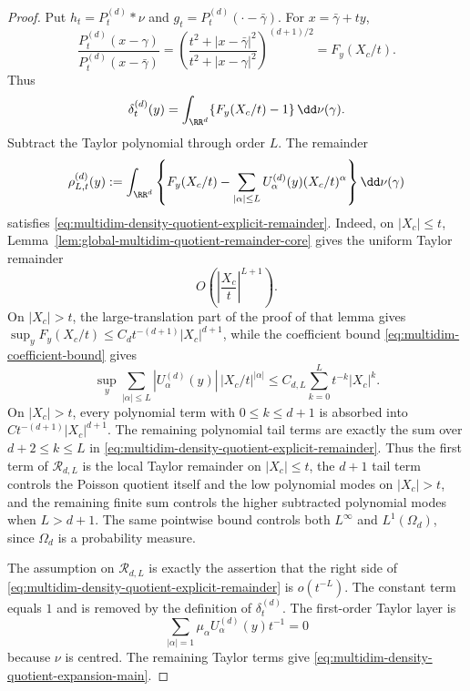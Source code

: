 \begin{proof}
Put \(h_t=P_t^{(d)}*\nu\) and \(g_t=P_t^{(d)}(\cdot-\bar{\gamma})\).
For \(x=\bar{\gamma}+ty\),
\[
\frac{P_t^{(d)}(x-\gamma)}{P_t^{(d)}(x-\bar{\gamma})}
=
\left(\frac{t^2+|x-\bar{\gamma}|^2}{t^2+|x-\gamma|^2}\right)^{(d+1)/2}
=F_y(X_c/t).
\]
Thus
\[
\delta_t^{(d)}(y)=\int_{\RR^d}\{F_y(X_c/t)-1\}\,\dd\nu(\gamma).
\]
Subtract the Taylor polynomial through order \(L\).  The remainder
\[
\rho_{L,t}^{(d)}(y):=
\int_{\RR^d}\left\{
F_y(X_c/t)-\sum_{|\alpha|\le L}U_\alpha^{(d)}(y)(X_c/t)^\alpha
\right\}\dd\nu(\gamma)
\]
satisfies \eqref{eq:multidim-density-quotient-explicit-remainder}.  Indeed,
on \(|X_c|\le t\), Lemma~\ref{lem:global-multidim-quotient-remainder-core}
gives the uniform Taylor remainder
\[
O\!\left(\left|\frac{X_c}{t}\right|^{L+1}\right).
\]
On \(|X_c|>t\), the large-translation part of the proof of that lemma gives
\(\sup_yF_y(X_c/t)\le C_dt^{-(d+1)}|X_c|^{d+1}\), while the coefficient bound
\eqref{eq:multidim-coefficient-bound} gives
\[
\sup_y\sum_{|\alpha|\le L}
|U_\alpha^{(d)}(y)|\,|X_c/t|^{|\alpha|}
\le C_{d,L}\sum_{k=0}^{L}t^{-k}|X_c|^k .
\]
On \(|X_c|>t\), every polynomial term with \(0\le k\le d+1\) is absorbed into
\(Ct^{-(d+1)}|X_c|^{d+1}\).  The remaining polynomial tail terms are exactly
the sum over \(d+2\le k\le L\) in
\eqref{eq:multidim-density-quotient-explicit-remainder}.  Thus the first term
of \(\mathcal R_{d,L}\) is the local Taylor remainder on \(|X_c|\le t\), the
\(d+1\) tail term controls the Poisson quotient itself and the low polynomial
modes on \(|X_c|>t\), and the remaining finite sum controls the higher
subtracted polynomial modes when \(L>d+1\).  The same pointwise
bound controls both \(L^\infty\) and \(L^1(\Omega_d)\), since \(\Omega_d\) is a
probability measure.

The assumption on \(\mathcal R_{d,L}\) is exactly the assertion that the
right side of \eqref{eq:multidim-density-quotient-explicit-remainder} is
\(o(t^{-L})\).
The constant term equals \(1\) and is removed by the definition of
\(\delta_t^{(d)}\).  The first-order Taylor layer is
\[
\sum_{|\alpha|=1}\mu_\alpha U_\alpha^{(d)}(y)t^{-1}=0
\]
because \(\nu\) is centred.  The remaining Taylor terms give
\eqref{eq:multidim-density-quotient-expansion-main}.


\end{proof}
